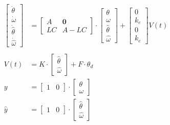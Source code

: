 \documentclass[10pt,a4paper]{report}
\begin{document}
\begin{align}
\begin{bmatrix}
\dot{\theta}\\
\dot{\omega}\\
\dot{\hat{\theta}}\\
\dot{\hat{\omega}}
\end{bmatrix} &= \begin{bmatrix}
A & \mathbf{0}\\
LC & A-LC
\end{bmatrix}\cdot\begin{bmatrix}
\theta\\
\omega\\
\hat{\theta}\\
\hat{\omega}
\end{bmatrix}+\begin{bmatrix}
0\\
k_e\\
0\\
k_e
\end{bmatrix}V(t)\\ \label{eq502}\\
V(t) &= K\cdot\begin{bmatrix}
\hat{\theta}\\
\hat{\omega}
\end{bmatrix} + F\cdot \theta_d\\
y &= \begin{bmatrix}
1& 0
\end{bmatrix}\cdot\begin{bmatrix}
\theta\\
\omega
\end{bmatrix}\\
\hat{y} &= \begin{bmatrix}
1& 0
\end{bmatrix}\cdot\begin{bmatrix}
\hat{\theta}\\
\hat{\omega}
\end{bmatrix}
\end{align}
\end{document}
